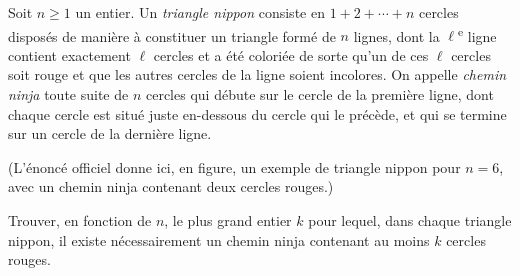 Soit $n \geqslant 1$ un entier. Un \emph{triangle nippon} consiste en $1 + 2 + \cdots + n$ cercles disposés
de manière à constituer un triangle formé de $n$ lignes, dont la $\ell$\textsuperscript{e} ligne contient
exactement $\ell$ cercles et a été coloriée de sorte qu'un de ces $\ell$ cercles soit rouge et que les autres
cercles de la ligne soient incolores. On appelle \emph{chemin ninja} toute suite de $n$ cercles qui débute
sur le cercle de la première ligne, dont chaque cercle est situé juste en-dessous du cercle qui le précède,
et qui se termine sur un cercle de la dernière ligne.

(L'énoncé officiel donne ici, en figure, un exemple de triangle nippon pour $n = 6$, avec un chemin ninja
contenant deux cercles rouges.)

Trouver, en fonction de $n$, le plus grand entier $k$ pour lequel, dans chaque triangle nippon, il existe
nécessairement un chemin ninja contenant au moins $k$ cercles rouges.
